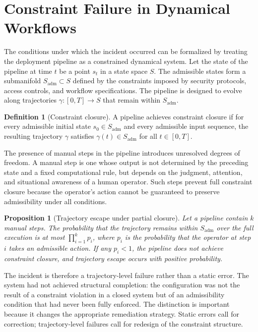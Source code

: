 \documentclass[12pt, oneside]{article}
\theoremstyle{plain}
\newtheorem{proposition}[theorem]{Proposition}
\theoremstyle{definition}
\newtheorem{definition}[theorem]{Definition}
\theoremstyle{remark}
\newcommand{\traj}{\gamma}
\begin{document}
\section{Constraint Failure in Dynamical Workflows}

The conditions under which the incident occurred can be formalized by treating the
deployment pipeline as a constrained dynamical system. Let the state of the pipeline at
time $t$ be a point $s_t$ in a state space $S$. The admissible states form a submanifold
$S_{\text{adm}} \subset S$ defined by the constraints imposed by security protocols, access
controls, and workflow specifications. The pipeline is designed to evolve along trajectories
$\traj : [0, T] \to S$ that remain within $S_{\text{adm}}$.

\begin{definition}[Constraint closure]
A pipeline achieves constraint closure if for every admissible initial state $s_0 \in S_{\text{adm}}$
and every admissible input sequence, the resulting trajectory $\traj$ satisfies
$\traj(t) \in S_{\text{adm}}$ for all $t \in [0, T]$.
\end{definition}

The presence of manual steps in the pipeline introduces unresolved degrees of freedom.
A manual step is one whose output is not determined by the preceding state and a fixed
computational rule, but depends on the judgment, attention, and situational awareness of
a human operator. Such steps prevent full constraint closure because the operator's action
cannot be guaranteed to preserve admissibility under all conditions.

\begin{proposition}[Trajectory escape under partial closure]
Let a pipeline contain $k$ manual steps. The probability that the trajectory remains within
$S_{\text{adm}}$ over the full execution is at most $\prod_{i=1}^k p_i$, where $p_i$ is the
probability that the operator at step $i$ takes an admissible action. If any $p_i < 1$,
the pipeline does not achieve constraint closure, and trajectory escape occurs with positive
probability.
\end{proposition}

The incident is therefore a trajectory-level failure rather than a static error. The system
had not achieved structural completion: the configuration was not the result of a constraint
violation in a closed system but of an admissibility condition that had never been fully
enforced. The distinction is important because it changes the appropriate remediation
strategy. Static errors call for correction; trajectory-level failures call for redesign
of the constraint structure.
\end{document}
